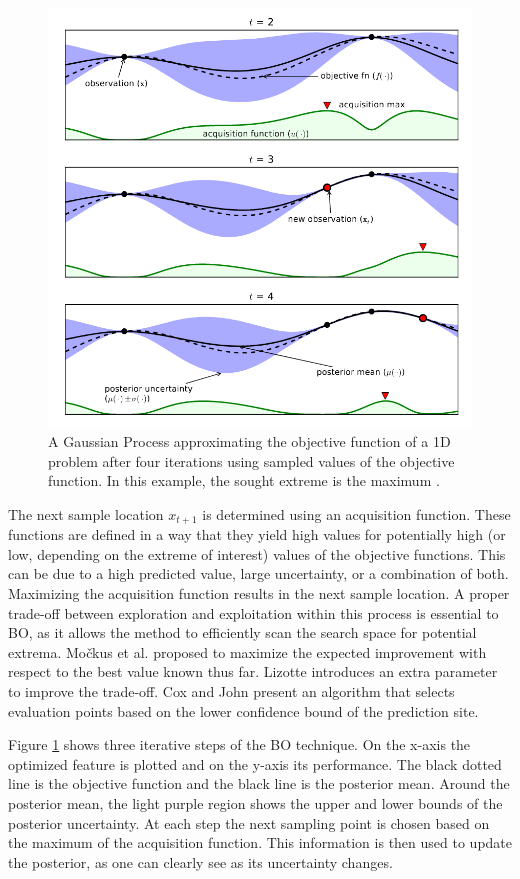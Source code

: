 \begin{figure}[h]
    \centering
    \includegraphics[width=0.6\linewidth]{Literature Survey - DCSC template/figuresLIT/BayesianOptmization.png}
    \caption{A Gaussian Process approximating the objective function of a 1D problem after four iterations using sampled values of the objective function. In this example, the sought extreme is the maximum \cite{bo_tutorial}.}
    \label{fig::BO}
\end{figure}

The next sample location $x_{t+1}$ is determined using an acquisition function. These functions are defined in a way that they yield high values for potentially high (or low, depending on the extreme of interest) values of the objective functions. This can be due to a high predicted value, large uncertainty, or a combination of both. Maximizing the acquisition function results in the next sample location. A proper trade-off between exploration and exploitation within this process is essential to BO, as it allows the method to efficiently scan the search space for potential extrema. 
Močkus et al. \cite{Mockus1978} proposed to maximize the expected improvement with respect to the best value known thus far. Lizotte \cite{Lizotte2008} introduces an extra parameter to improve the trade-off. Cox and John \cite{CoxJohn1997} present an algorithm that selects evaluation points based on the lower confidence bound of the prediction site. 

Figure \ref{fig::BO} shows three iterative steps of the BO technique. On the x-axis the optimized feature is plotted and on the y-axis its performance. The black dotted line is the objective function and the black line is the posterior mean. Around the posterior mean, the light purple region shows the upper and lower bounds of the posterior uncertainty. At each step the next sampling point is chosen based on the maximum of the acquisition function. This information is then used to update the posterior, as one can clearly see as its uncertainty changes.


